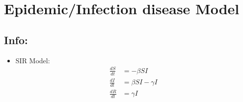\chapter{Epidemic/Infection disease Model}
\section*{Info:}
\begin{itemize}
    \item SIR Model:
    \begin{align}
    \frac{dS}{dt} &= -\beta S I \tag{1} \\
    \frac{dI}{dt} &= \beta S I - \gamma I \tag{2} \\
    \frac{dR}{dt} &= \gamma I \tag{3}
\end{align}
\end{itemize}